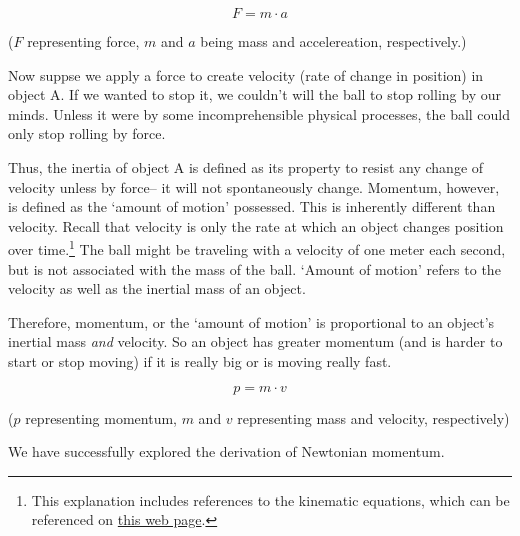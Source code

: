 \documentclass{article}
\begin{document}
                \begin{equation}\label{eq:1}
                    F = m \cdot a
                \end{equation}
                \begin{center}
                    ($F$ representing force, $m$ and $a$ being mass and accelereation, respectively.)
                \end{center}
                
                Now suppse we apply a force to create velocity (rate of change in position) in object A.
                If we wanted to stop it, we couldn't will the ball to stop rolling by our minds. Unless it were by some incomprehensible physical processes, the ball could only stop rolling by force.
                \par
                Thus, the inertia of object A is defined as its property to resist any change of velocity unless by force-- it will not spontaneously change. Momentum, however, is defined as the `amount of motion' possessed. 
                This is inherently different than velocity. Recall that velocity is only the rate at which an object changes position over time.\footnote{This explanation includes references to the kinematic equations, which can be referenced on \href{https://byjus.com/physics/kinematics-equations/}{this web page}.} 
                The ball might be traveling with a velocity of one meter each second, but is not associated with the mass of the ball. `Amount of motion' refers to the velocity as well as the inertial mass of an object.
                \par
                Therefore, momentum, or the `amount of motion' is proportional to an object's inertial mass \emph{and} velocity. So an object has greater momentum (and is harder to start or stop moving) if it is really big or is moving really fast. 

                \begin{equation}\label{eq:2}
                    p = m \cdot v
                \end{equation}
                \begin{center}
                    ($p$ representing momentum, $m$ and $v$ representing mass and velocity, respectively)
                \end{center}

                We have successfully explored the derivation of Newtonian momentum.
\end{document}
